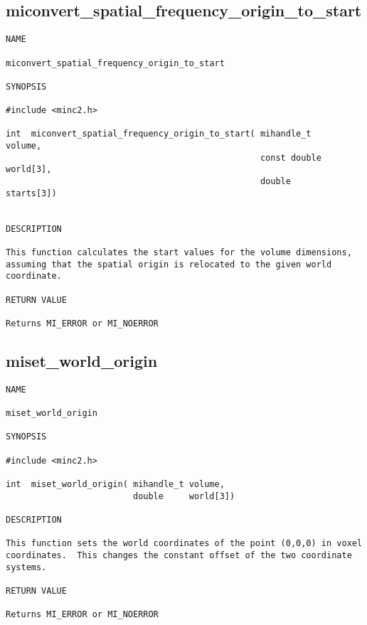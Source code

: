\documentclass{article}
\begin{document}
\subsection{miconvert\_spatial\_frequency\_origin\_to\_start}
\begin{verbatim}
NAME 

miconvert_spatial_frequency_origin_to_start

SYNOPSIS

#include <minc2.h>

int  miconvert_spatial_frequency_origin_to_start( mihandle_t         volume,
                                                  const double       world[3],
                                                  double             starts[3])
                       
                                
DESCRIPTION

This function calculates the start values for the volume dimensions,
assuming that the spatial origin is relocated to the given world
coordinate.

RETURN VALUE

Returns MI_ERROR or MI_NOERROR

\end{verbatim}

\subsection{miset\_world\_origin}
\begin{verbatim}
NAME 

miset_world_origin

SYNOPSIS

#include <minc2.h>

int  miset_world_origin( mihandle_t volume,
                         double     world[3])
                       
DESCRIPTION

This function sets the world coordinates of the point (0,0,0) in voxel
coordinates.  This changes the constant offset of the two coordinate
systems.

RETURN VALUE

Returns MI_ERROR or MI_NOERROR

\end{verbatim}
\end{document}
